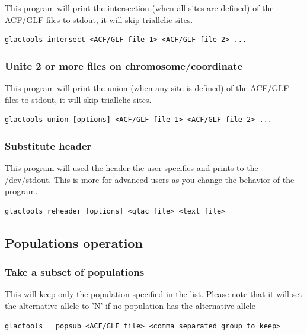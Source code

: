 \documentclass[a4paper]{article}
\begin{document}
\noindent This program will print the intersection (when all sites are defined) of the ACF/GLF files to stdout, it will skip triallelic sites.

\begin{lstlisting}
glactools intersect <ACF/GLF file 1> <ACF/GLF file 2> ...
\end{lstlisting}

\subsubsection{Unite 2 or more files on chromosome/coordinate}

\noindent This program will print the union (when any site is defined) of the ACF/GLF files to stdout, it will skip triallelic sites.

\begin{lstlisting}
glactools union [options] <ACF/GLF file 1> <ACF/GLF file 2> ...
\end{lstlisting}


\subsubsection{Substitute header}
\noindent This program will used the header the user specifies and prints to the /dev/stdout. This is more for advanced users as you change the behavior of the program.

\begin{lstlisting}
glactools reheader [options] <glac file> <text file>
\end{lstlisting}



\subsection{Populations operation}

\subsubsection{Take a subset of populations}

\noindent This will keep only the population specified in the list. Please note that it will set the alternative allele to 'N' if no population has the alternative allele

\begin{lstlisting}
glactools   popsub <ACF/GLF file> <comma separated group to keep>
\end{lstlisting}
\end{document}
